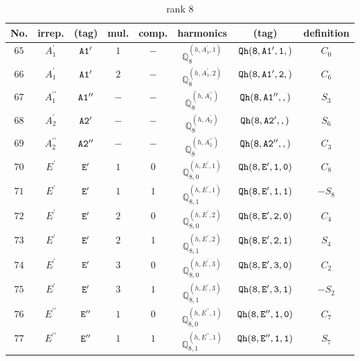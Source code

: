 \documentclass[fleqn,8pt]{jsarticle}
\begin{document}
\begin{table}[ht!]
\begin{center}
\caption{rank 8}
\renewcommand{\arraystretch}{1.3}
\begin{tabular}{cccccccc} \hline \hline
No. & irrep. & (tag) & mul. & comp. & harmonics & (tag) & definition \\ \hline
$ 65 $ & $ A_{1}^{\prime} $ & $ {\tt A1'} $ & $ 1 $ & $ - $ & $ \mathbb{Q}_{8}^{(h,A_{1}^{\prime},1)} $ & $ {\tt Qh(8,A1',1,)} $ & $ C_{0} $ \\
$ 66 $ & $ A_{1}^{\prime} $ & $ {\tt A1'} $ & $ 2 $ & $ - $ & $ \mathbb{Q}_{8}^{(h,A_{1}^{\prime},2)} $ & $ {\tt Qh(8,A1',2,)} $ & $ C_{6} $ \\
$ 67 $ & $ A_{1}^{\prime\prime} $ & $ {\tt A1''} $ & $ - $ & $ - $ & $ \mathbb{Q}_{8}^{(h,A_{1}^{\prime\prime})} $ & $ {\tt Qh(8,A1'',,)} $ & $ S_{3} $ \\
$ 68 $ & $ A_{2}^{\prime} $ & $ {\tt A2'} $ & $ - $ & $ - $ & $ \mathbb{Q}_{8}^{(h,A_{2}^{\prime})} $ & $ {\tt Qh(8,A2',,)} $ & $ S_{6} $ \\
$ 69 $ & $ A_{2}^{\prime\prime} $ & $ {\tt A2''} $ & $ - $ & $ - $ & $ \mathbb{Q}_{8}^{(h,A_{2}^{\prime\prime})} $ & $ {\tt Qh(8,A2'',,)} $ & $ C_{3} $ \\
$ 70 $ & $ E^{\prime} $ & $ {\tt E'} $ & $ 1 $ & $ 0 $ & $ \mathbb{Q}_{8,0}^{(h,E^{\prime},1)} $ & $ {\tt Qh(8,E',1,0)} $ & $ C_{8} $ \\
$ 71 $ & $ E^{\prime} $ & $ {\tt E'} $ & $ 1 $ & $ 1 $ & $ \mathbb{Q}_{8,1}^{(h,E^{\prime},1)} $ & $ {\tt Qh(8,E',1,1)} $ & $ - S_{8} $ \\
$ 72 $ & $ E^{\prime} $ & $ {\tt E'} $ & $ 2 $ & $ 0 $ & $ \mathbb{Q}_{8,0}^{(h,E^{\prime},2)} $ & $ {\tt Qh(8,E',2,0)} $ & $ C_{4} $ \\
$ 73 $ & $ E^{\prime} $ & $ {\tt E'} $ & $ 2 $ & $ 1 $ & $ \mathbb{Q}_{8,1}^{(h,E^{\prime},2)} $ & $ {\tt Qh(8,E',2,1)} $ & $ S_{4} $ \\
$ 74 $ & $ E^{\prime} $ & $ {\tt E'} $ & $ 3 $ & $ 0 $ & $ \mathbb{Q}_{8,0}^{(h,E^{\prime},3)} $ & $ {\tt Qh(8,E',3,0)} $ & $ C_{2} $ \\
$ 75 $ & $ E^{\prime} $ & $ {\tt E'} $ & $ 3 $ & $ 1 $ & $ \mathbb{Q}_{8,1}^{(h,E^{\prime},3)} $ & $ {\tt Qh(8,E',3,1)} $ & $ - S_{2} $ \\
$ 76 $ & $ E^{\prime\prime} $ & $ {\tt E''} $ & $ 1 $ & $ 0 $ & $ \mathbb{Q}_{8,0}^{(h,E^{\prime\prime},1)} $ & $ {\tt Qh(8,E'',1,0)} $ & $ C_{7} $ \\
$ 77 $ & $ E^{\prime\prime} $ & $ {\tt E''} $ & $ 1 $ & $ 1 $ & $ \mathbb{Q}_{8,1}^{(h,E^{\prime\prime},1)} $ & $ {\tt Qh(8,E'',1,1)} $ & $ S_{7} $ \\

\end{tabular}
\end{center}
\end{table}
\end{document}
